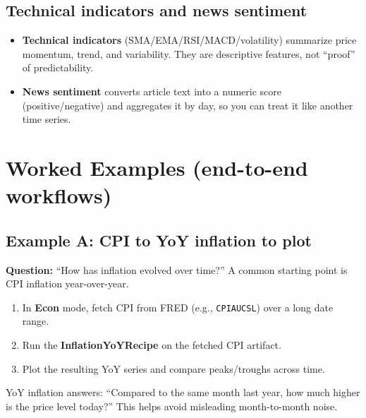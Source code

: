 \documentclass[11pt,a4paper]{article}
\begin{document}
\subsection{Technical indicators and news sentiment}
\begin{itemize}[leftmargin=2em]
  \item \textbf{Technical indicators} (SMA/EMA/RSI/MACD/volatility) summarize price momentum, trend, and variability. They are descriptive features, not ``proof'' of predictability.
  \item \textbf{News sentiment} converts article text into a numeric score (positive/negative) and aggregates it by day, so you can treat it like another time series.
\end{itemize}

\section{Worked Examples (end-to-end workflows)}

\subsection{Example A: CPI to YoY inflation to plot}
\textbf{Question:} ``How has inflation evolved over time?'' A common starting point is CPI inflation year-over-year.
\begin{enumerate}[leftmargin=2.2em]
  \item In \textbf{Econ} mode, fetch CPI from FRED (e.g., \texttt{CPIAUCSL}) over a long date range.
  \item Run the \textbf{InflationYoYRecipe} on the fetched CPI artifact.
  \item Plot the resulting YoY series and compare peaks/troughs across time.
\end{enumerate}
\begin{intuitionbox}
YoY inflation answers: ``Compared to the same month last year, how much higher is the price level today?'' This helps avoid misleading month-to-month noise.
\end{intuitionbox}
\end{document}
